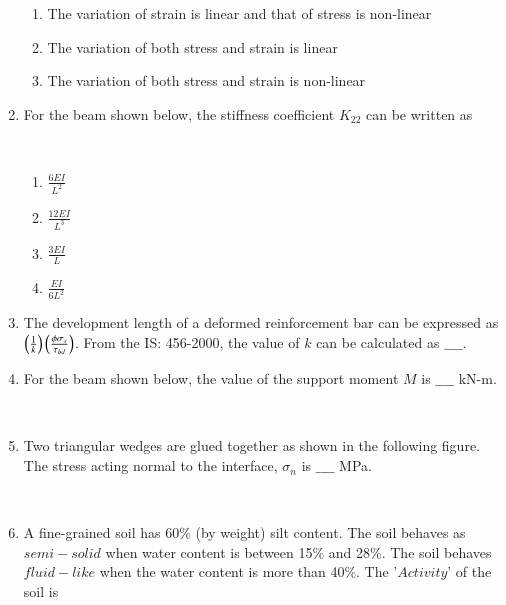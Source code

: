 \documentclass[journal]{IEEEtran}
\begin{document}
\begin{enumerate}
\begin{enumerate}
    \item The variation of strain is linear and that of stress is non-linear
    \item The variation of both stress and strain is linear
    \item The variation of both stress and strain is non-linear \\
\end{enumerate}
\item For the beam shown below, the stiffness coefficient $K_{22}$ can be written as
\begin{figure}[!ht]
\centering
\resizebox{0.5\textwidth}{!}{%

}%
\end{figure} \\
\begin{enumerate}
    \item $\frac{6EI}{L^2}$
    \item $\frac{12EI}{L^3}$
    \item $\frac{3EI}{L}$
    \item $\frac{EI}{6L^2}$ \\
\end{enumerate}
\item The development length of a deformed reinforcement bar can be expressed as $\left(\frac{1}{k}\right)\left(\frac{\phi\sigma_s}{\tau_{bd}}\right)$. From the IS: 456-2000, the value of $k$ can be calculated as $\_\_\_\_$. \\
\item For the beam shown below, the value of the support moment $M$ is $\_\_\_\_$ kN-m.
\begin{figure}[!ht]
\centering
\resizebox{0.5\textwidth}{!}{%

}%
\end{figure} \\
\pagebreak
\item Two triangular wedges are glued together as shown in the following figure. The stress acting normal to the interface, $\sigma_n$ is $\_\_\_\_$ MPa.
\begin{figure}[!ht]
\centering
\resizebox{0.5\textwidth}{!}{%

}%
\end{figure} \\
\item A fine-grained soil has 60\% (by weight) silt content. The soil behaves as $semi-solid$ when water content is between 15\% and 28\%. The soil behaves $fluid-like$ when the water content is more than 40\%. The '$Activity$' of the soil is
\begin{enumerate}

\end{enumerate}
\end{enumerate}
\end{document}
